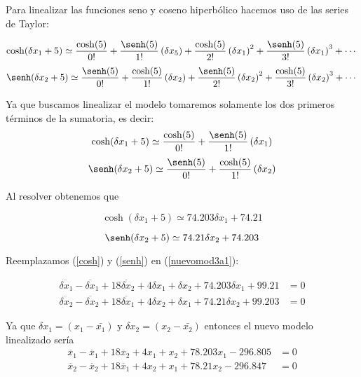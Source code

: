 \documentclass[letterpaper, 12pt]{article}
\begin{document}
\begin{enumerate}
\begin{enumerate}
Para linealizar las funciones seno y coseno hiperbólico hacemos uso de las series de Taylor: 

\begin{equation}
    \notag
    \cosh(\delta x_1 + 5)\simeq \frac{\cosh(5)}{0!}+\frac{\senh(5)}{1!}\left(\delta x_5\right)+\frac{\cosh(5)}{2!}\left(\delta x_1\right)^2+\frac{\senh(5)}{3!}\left(\delta x_1\right)^3+ \cdots
\end{equation}
\begin{equation}
    \notag
    \senh(\delta x_2 + 5)\simeq \frac{\senh(5)}{0!}+\frac{\cosh(5)}{1!}\left(\delta x_2\right)+\frac{\senh(5)}{2!}\left(\delta x_2\right)^2+\frac{\cosh(5)}{3!}\left(\delta x_2\right)^3+ \cdots
\end{equation}

Ya que buscamos linealizar el modelo tomaremos solamente los dos primeros términos de la sumatoria, es decir:
\begin{equation}
    \notag
    \cosh(\delta x_1 + 5)\simeq \frac{\cosh(5)}{0!}+\frac{\senh(5)}{1!}\left(\delta x_1\right)
\end{equation}
\begin{equation}
    \notag
    \senh(\delta x_2 + 5)\simeq \frac{\senh(5)}{0!}+\frac{\cosh(5)}{1!}\left(\delta x_2\right)
\end{equation}

Al resolver obtenemos que

\begin{equation}
    \cosh(\delta x_1 + 5)\simeq 74.203\delta x_1+74.21
    \label{cosh}
\end{equation}

\begin{equation}
    \senh(\delta x_2 + 5)\simeq 74.21\delta x_2+74.203
    \label{senh}
\end{equation}

Reemplazamos (\ref{cosh}) y (\ref{senh}) en (\ref{nuevomod3a1}):

\begin{equation}
\begin{split}
    \dddot{\delta x_1}-\ddot{\delta x_1}+18\ddot{\delta x_2}+4\delta x_1 +\delta x_2 +74.203\delta x_1+99.21 &= 0 \\ \dddot{\delta x_2}-\ddot{\delta x_2}+18\ddot{\delta x_1}+4\delta x_2 +\delta x_1 +74.21\delta x_2+99.203 &= 0 
\end{split}
\label{nuevomod3a1}
\end{equation}

Ya que $\delta x_1 = (x_1-\bar {x_1})$ y $\delta x_2 = (x_2-\bar{x_2})$ entonces el nuevo modelo linealizado sería 
\begin{equation}
\begin{split}
    \dddot{x_1}-\ddot{x_1}+18\ddot{x_2}+4x_1 + x_2 +78.203 x_1-296.805 &= 0 \\ \dddot{x_2}-\ddot{x_2}+18\ddot{x_1}+4x_2 +x_1 +78.21 x_2-296.847 &= 0 
\end{split}
\label{nuevomod3afinish}
\end{equation}


\end{enumerate}
\end{enumerate}
\end{document}
